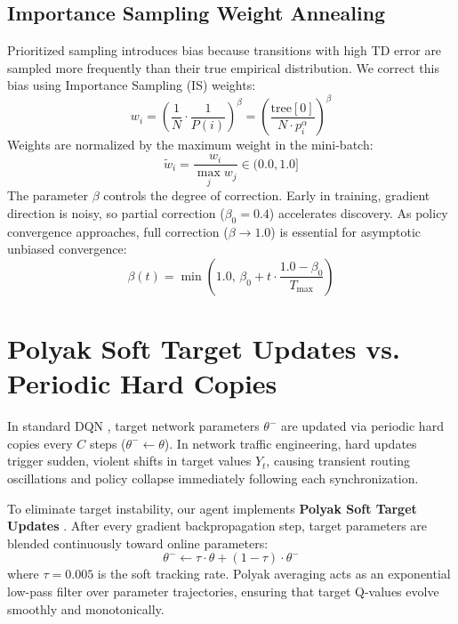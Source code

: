 \documentclass[12pt,a4paper,oneside]{report}
\begin{document}
\subsection{Importance Sampling Weight Annealing}
Prioritized sampling introduces bias because transitions with high TD error are sampled more frequently than their true empirical distribution. We correct this bias using Importance Sampling (IS) weights:
\begin{equation}
    w_i = \left( \frac{1}{N} \cdot \frac{1}{P(i)} \right)^\beta = \left( \frac{\text{tree}[0]}{N \cdot p_i^\alpha} \right)^\beta
\end{equation}
Weights are normalized by the maximum weight in the mini-batch:
\begin{equation}
    \tilde{w}_i = \frac{w_i}{\max_j w_j} \in (0.0, 1.0]
\end{equation}
The parameter $\beta$ controls the degree of correction. Early in training, gradient direction is noisy, so partial correction ($\beta_0 = 0.4$) accelerates discovery. As policy convergence approaches, full correction ($\beta \to 1.0$) is essential for asymptotic unbiased convergence:
\begin{equation}
    \beta(t) = \min\left(1.0, \, \beta_0 + t \cdot \frac{1.0 - \beta_0}{T_{\text{max}}}\right)
\end{equation}

\section{Polyak Soft Target Updates vs. Periodic Hard Copies}
In standard DQN \cite{mnih2015human}, target network parameters $\theta^-$ are updated via periodic hard copies every $C$ steps ($\theta^- \gets \theta$). In network traffic engineering, hard updates trigger sudden, violent shifts in target values $Y_t$, causing transient routing oscillations and policy collapse immediately following each synchronization.

To eliminate target instability, our agent implements \textbf{Polyak Soft Target Updates} \cite{lillicrap2015continuous}. After every gradient backpropagation step, target parameters are blended continuously toward online parameters:
\begin{equation}
    \theta^- \gets \tau \cdot \theta + (1 - \tau) \cdot \theta^-
    \label{eq:polyak_update}
\end{equation}
where $\tau = 0.005$ is the soft tracking rate. Polyak averaging acts as an exponential low-pass filter over parameter trajectories, ensuring that target Q-values evolve smoothly and monotonically.
\end{document}
